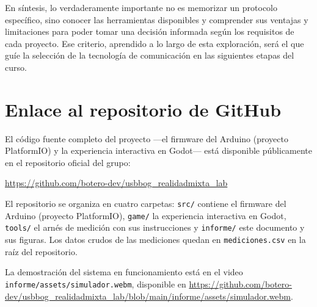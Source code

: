 \documentclass[journal]{IEEEtran}
\begin{document}
En síntesis, lo verdaderamente importante no es memorizar un protocolo específico, sino conocer las herramientas disponibles y comprender sus ventajas y limitaciones para poder tomar una decisión informada según los requisitos de cada proyecto. Ese criterio, aprendido a lo largo de esta exploración, será el que guíe la selección de la tecnología de comunicación en las siguientes etapas del curso.





\section{Enlace al repositorio de GitHub}

El código fuente completo del proyecto ---el firmware del Arduino (proyecto PlatformIO) y la experiencia interactiva en Godot--- está disponible públicamente en el repositorio oficial del grupo:

\begin{center}
\url{https://github.com/botero-dev/usbbog_realidadmixta_lab}
\end{center}

El repositorio se organiza en cuatro carpetas: \texttt{src/} contiene el firmware del Arduino (proyecto PlatformIO), \texttt{game/} la experiencia interactiva en Godot, \texttt{tools/} el arnés de medición con sus instrucciones y \texttt{informe/} este documento y sus figuras. Los datos crudos de las mediciones quedan en \texttt{mediciones.csv} en la raíz del repositorio.

La demostración del sistema en funcionamiento está en el video \texttt{informe/\allowbreak assets/\allowbreak simulador.webm}, disponible en \url{https://github.com/botero-dev/usbbog_realidadmixta_lab/blob/main/informe/assets/simulador.webm}.
\end{document}
